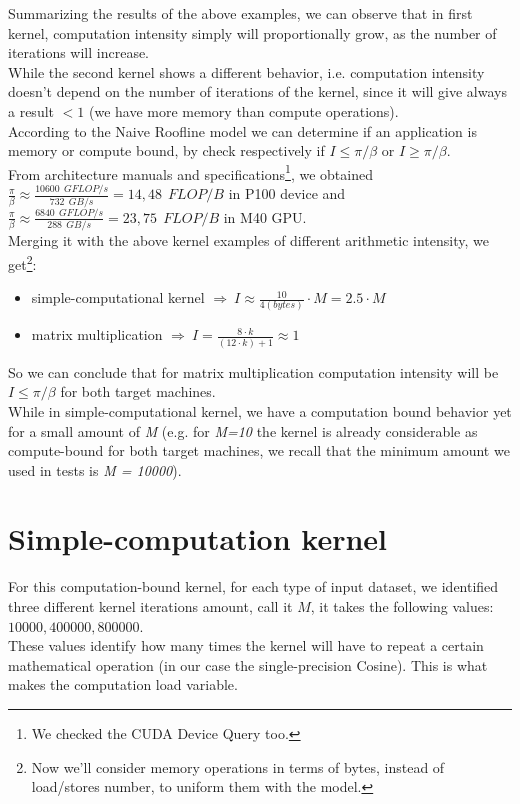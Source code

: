 	Summarizing the results of the above examples, we can observe that in first kernel, computation intensity simply will proportionally grow, as the number of iterations will increase.\\
	While the second kernel shows a different behavior, i.e. computation intensity doesn't depend on the number of iterations of the kernel, since it will give always a result \(< 1\) (we have more memory than compute operations).\\
	According to the Naive Roofline model we can determine if an application is memory or compute bound, by check respectively if \(I \leq \pi / \beta \) or \(I \geq \pi / \beta \).\\
	From architecture manuals\cite{p100whitepaper} and specifications\footnote{We checked the CUDA Device Query too.}, we obtained\\
	 \( \frac{\pi}{\beta} \approx \frac{10600 \ \  GFLOP/s}{732 \ \ GB/s} = 14,48 \ \ FLOP/B \) in P100 device and\\
	 \( \frac{\pi}{\beta} \approx \frac{6840 \ \ GFLOP/s}{288 \ \ GB/s} = 23,75 \ \ FLOP/B \) in M40 GPU.\\
	Merging it with the above kernel examples of different arithmetic intensity, we get\footnote{Now we'll consider memory operations in terms of bytes, instead of load/stores number, to uniform them with the model.}:
	\begin{itemize}
		\item simple-computational kernel \( \Longrightarrow \ I \approx \frac{10}{4 (bytes)} \cdot M = 2.5 \cdot M \)
		\item matrix multiplication \(\Longrightarrow \ I = \frac{8 \cdot k}{(12 \cdot k)+1} \approx 1 \)
	\end{itemize}
	So we can conclude that for matrix multiplication computation intensity will be \(I \leq \pi / \beta \) for both target machines.\\
	While in simple-computational kernel, we have a computation bound behavior yet for a small amount of \textit{M} (e.g. for \textit{M=10} the kernel is already considerable as compute-bound for both target machines, we recall that the minimum amount we used in tests is \textit{M = 10000}).
	
	
\section{Simple-computation kernel}
For this computation-bound kernel, for each type of input dataset, we identified three different kernel iterations amount, call it \(M\), it takes the following values: \(10 000, 400 000, 800 000\).\\
These values identify how many times the kernel will have to repeat a certain mathematical operation (in our case the single-precision Cosine). This is what makes the computation load variable.

